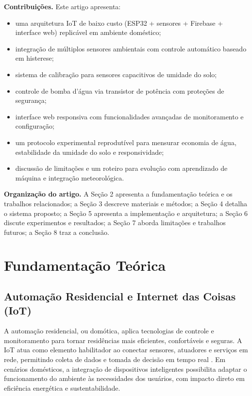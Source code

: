 \documentclass[twoside,english,brazilian]{UNISINOSmonografia}
\begin{document}
\noindent\textbf{Contribuições.} Este artigo apresenta:
\begin{itemize}
    \item uma arquitetura IoT de baixo custo (ESP32 + sensores + Firebase + interface web) replicável em ambiente doméstico;
    \item integração de múltiplos sensores ambientais com controle automático baseado em histerese;
    \item sistema de calibração para sensores capacitivos de umidade do solo;
    \item controle de bomba d'água via transistor de potência com proteções de segurança;
    \item interface web responsiva com funcionalidades avançadas de monitoramento e configuração;
    \item um protocolo experimental reprodutível para mensurar economia de água, estabilidade da umidade do solo e responsividade;
    \item discussão de limitações e um roteiro para evolução com aprendizado de máquina e integração meteorológica.
\end{itemize}

\noindent\textbf{Organização do artigo.} A Seção 2 apresenta a fundamentação teórica e os trabalhos relacionados; a Seção 3 descreve materiais e métodos; a Seção 4 detalha o sistema proposto; a Seção 5 apresenta a implementação e arquitetura; a Seção 6 discute experimentos e resultados; a Seção 7 aborda limitações e trabalhos futuros; a Seção 8 traz a conclusão.

\chapter{Fundamentação Teórica}

\section{Automação Residencial e Internet das Coisas (IoT)}
A automação residencial, ou domótica, aplica tecnologias de controle e monitoramento para tornar residências mais eficientes, confortáveis e seguras. A IoT atua como elemento habilitador ao conectar sensores, atuadores e serviços em rede, permitindo coleta de dados e tomada de decisão em tempo real \cite{silva2019}. Em cenários domésticos, a integração de dispositivos inteligentes possibilita adaptar o funcionamento do ambiente às necessidades dos usuários, com impacto direto em eficiência energética e sustentabilidade.
\end{document}
